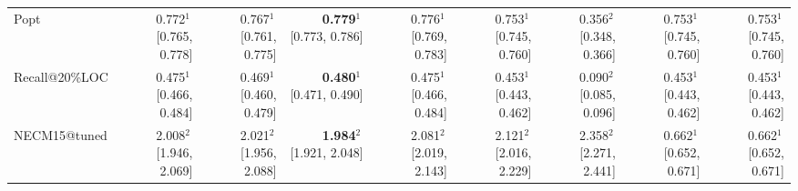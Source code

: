 \begin{tabular}{lrrrrrrrr}
Popt & 0.772$^{1}$\,{\scriptsize[0.765, 0.778]} & 0.767$^{1}$\,{\scriptsize[0.761, 0.775]} & \textbf{0.779$^{1}$}\,{\scriptsize[0.773, 0.786]} & 0.776$^{1}$\,{\scriptsize[0.769, 0.783]} & 0.753$^{1}$\,{\scriptsize[0.745, 0.760]} & 0.356$^{2}$\,{\scriptsize[0.348, 0.366]} & 0.753$^{1}$\,{\scriptsize[0.745, 0.760]} & 0.753$^{1}$\,{\scriptsize[0.745, 0.760]} \\
Recall@20\%LOC & 0.475$^{1}$\,{\scriptsize[0.466, 0.484]} & 0.469$^{1}$\,{\scriptsize[0.460, 0.479]} & \textbf{0.480$^{1}$}\,{\scriptsize[0.471, 0.490]} & 0.475$^{1}$\,{\scriptsize[0.466, 0.484]} & 0.453$^{1}$\,{\scriptsize[0.443, 0.462]} & 0.090$^{2}$\,{\scriptsize[0.085, 0.096]} & 0.453$^{1}$\,{\scriptsize[0.443, 0.462]} & 0.453$^{1}$\,{\scriptsize[0.443, 0.462]} \\
NECM15@tuned & 2.008$^{2}$\,{\scriptsize[1.946, 2.069]} & 2.021$^{2}$\,{\scriptsize[1.956, 2.088]} & \textbf{1.984$^{2}$}\,{\scriptsize[1.921, 2.048]} & 2.081$^{2}$\,{\scriptsize[2.019, 2.143]} & 2.121$^{2}$\,{\scriptsize[2.016, 2.229]} & 2.358$^{2}$\,{\scriptsize[2.271, 2.441]} & 0.662$^{1}$\,{\scriptsize[0.652, 0.671]} & 0.662$^{1}$\,{\scriptsize[0.652, 0.671]} \\
\bottomrule
\end{tabular}
